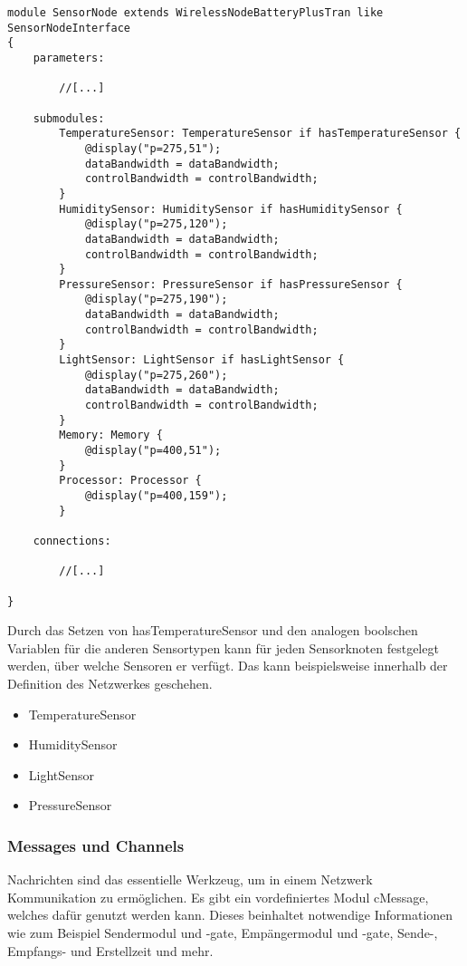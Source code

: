 \begin{lstlisting}[language=ned,caption={SensorNode mit den neu definierten Modulen},label=lst:SensorNode]
module SensorNode extends WirelessNodeBatteryPlusTran like SensorNodeInterface
{
    parameters:
    
        //[...]

    submodules:
        TemperatureSensor: TemperatureSensor if hasTemperatureSensor {
            @display("p=275,51");
            dataBandwidth = dataBandwidth;
            controlBandwidth = controlBandwidth;
        }
        HumiditySensor: HumiditySensor if hasHumiditySensor {
            @display("p=275,120");
            dataBandwidth = dataBandwidth;
            controlBandwidth = controlBandwidth;
        }
        PressureSensor: PressureSensor if hasPressureSensor {
            @display("p=275,190");
            dataBandwidth = dataBandwidth;
            controlBandwidth = controlBandwidth;
        }
        LightSensor: LightSensor if hasLightSensor {
            @display("p=275,260");
            dataBandwidth = dataBandwidth;
            controlBandwidth = controlBandwidth;
        }
        Memory: Memory {
            @display("p=400,51");
        }
        Processor: Processor {
            @display("p=400,159");
        }
        
    connections:
    
        //[...]
        
}        
\end{lstlisting}

Durch das Setzen von hasTemperatureSensor und den analogen boolschen Variablen für die anderen Sensortypen kann für jeden Sensorknoten festgelegt werden, über welche Sensoren er verfügt. Das kann beispielsweise innerhalb der Definition des Netzwerkes geschehen.

\begin{itemize}
\item TemperatureSensor
\item HumiditySensor
\item LightSensor
\item PressureSensor
\end{itemize}

\subsubsection{Messages und Channels}

Nachrichten sind das essentielle Werkzeug, um in einem Netzwerk Kommunikation zu ermöglichen. Es gibt ein vordefiniertes Modul cMessage, welches dafür genutzt werden kann. Dieses beinhaltet notwendige Informationen wie zum Beispiel Sendermodul und -gate, Empängermodul und -gate, Sende-, Empfangs- und Erstellzeit und mehr.

